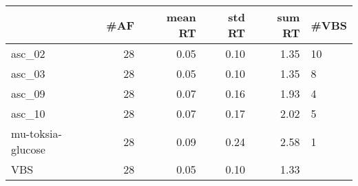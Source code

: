 \begin{tabular}{lrrrrl}
\toprule
{} &  \#AF &  mean RT &  std RT &  sum RT & \#VBS \\
\midrule
asc\_02            &   28 &     0.05 &    0.10 &    1.35 &   10 \\
asc\_03            &   28 &     0.05 &    0.10 &    1.35 &    8 \\
asc\_09            &   28 &     0.07 &    0.16 &    1.93 &    4 \\
asc\_10            &   28 &     0.07 &    0.17 &    2.02 &    5 \\
mu-toksia-glucose &   28 &     0.09 &    0.24 &    2.58 &    1 \\
VBS               &   28 &     0.05 &    0.10 &    1.33 &      \\
\bottomrule
\end{tabular}
